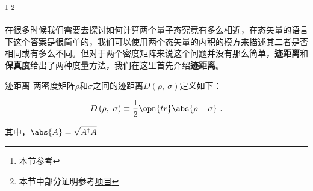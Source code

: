 
\footnote{本节参考\cite{量子信息}}
\footnote{本节中部分证明参考\href{https://github.com/goropikari/SolutionQCQINielsenChuang}{项目}}


在很多时候我们需要去探讨如何计算两个量子态究竟有多么相近，在态矢量的语言下这个答案是很简单的，我们可以使用两个态矢量的内积的模方来描述其二者是否相同或有多么不同。但对于两个密度矩阵来说这个问题并没有那么简单，\textbf{迹距离}和\textbf{保真度}给出了两种度量方法，我们在这里首先介绍\textbf{迹距离}。

\begin{definition}{迹距离}
两密度矩阵$\rho$和$\sigma$之间的迹距离$D\left(\rho,~\sigma\right)$定义如下：

\begin{equation}
D\left(\rho,~\sigma\right) \equiv \frac{1}{2} \opn{tr}\abs{\rho - \sigma}~.
\end{equation}

其中，$\abs{A} = \sqrt{A^\dagger A}$

\end{definition}




